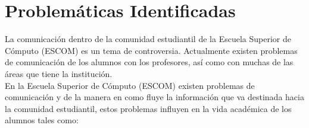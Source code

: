 	\section{Problemáticas Identificadas}



		La comunicación dentro de la comunidad estudiantil de la Escuela Superior de Cómputo (ESCOM) es un tema de controversia. Actualmente existen problemas de comunicación de los alumnos con los profesores, así como con muchas de las áreas que tiene la institución.\\
	
	En la Escuela Superior de Cómputo (ESCOM) existen problemas de comunicación y de la manera en como fluye la información que va destinada hacia la comunidad estudiantil, estos problemas influyen en la vida académica de los alumnos tales como:
